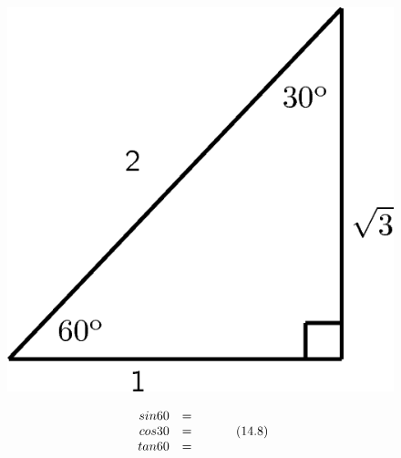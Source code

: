 \begin{enumerate}[noitemsep, label=\textbf{\arabic*}. ]
    \setcounter{subfigure}{0}
	\begin{figure}[H] %
    \begin{center}
    \label{m39408*id80508!!!underscore!!!media}\label{m39408*id80508!!!underscore!!!printimage}\includegraphics{col11306.imgs/m39408_MG10C15_006.png} %
      \vspace{2pt}
    \vspace{.1in}
    \end{center}
 \end{figure}       \label{m39408*id80519}\nopagebreak\noindent{}
    \begin{equation}
    \begin{array}{ccc}\hfill sin60& =& \\ \hfill cos30& =& \\ \hfill tan60& =\end{array}\tag{14.8}
      \end{equation}
    \setcounter{subfigure}{0}
	\begin{figure}[H] %
    \begin{center}

\end{center}
\end{figure}
\end{enumerate}
